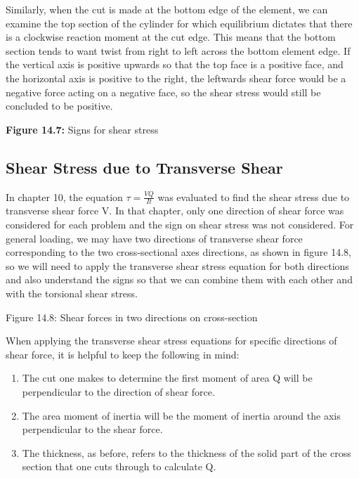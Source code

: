 \documentclass[
  letterpaper,
  DIV=11,
  numbers=noendperiod]{scrreprt}
\providecommand{\tightlist}{%
  \setlength{\itemsep}{0pt}\setlength{\parskip}{0pt}}\usepackage{longtable,booktabs,array}
\begin{document}
Similarly, when the cut is made at the bottom edge of the element, we
can examine the top section of the cylinder for which equilibrium
dictates that there is a clockwise reaction moment at the cut edge. This
means that the bottom section tends to want twist from right to left
across the bottom element edge. If the vertical axis is positive upwards
so that the top face is a positive face, and the horizontal axis is
positive to the right, the leftwards shear force would be a negative
force acting on a negative face, so the shear stress would still be
concluded to be positive.

\textbf{Figure 14.7:} Signs for shear stress

\subsection{Shear Stress due to Transverse
Shear}\label{shear-stress-due-to-transverse-shear}

In chapter 10, the equation \(\tau=\frac{V Q}{I t}\) was evaluated to
find the shear stress due to transverse shear force V. In that chapter,
only one direction of shear force was considered for each problem and
the sign on shear stress was not considered. For general loading, we may
have two directions of transverse shear force corresponding to the two
cross-sectional axes directions, as shown in figure 14.8, so we will
need to apply the transverse shear stress equation for both directions
and also understand the signs so that we can combine them with each
other and with the torsional shear stress.

Figure 14.8: Shear forces in two directions on cross-section

When applying the transverse shear stress equations for specific
directions of shear force, it is helpful to keep the following in mind:

\begin{enumerate}
\def\labelenumi{\arabic{enumi}.}
\tightlist
\item
  The cut one makes to determine the first moment of area Q will be
  perpendicular to the direction of shear force.
\item
  The area moment of inertia will be the moment of inertia around the
  axis perpendicular to the shear force.
\item
  The thickness, as before, refers to the thickness of the solid part of
  the cross section that one cuts through to calculate Q.
\end{enumerate}
\end{document}
